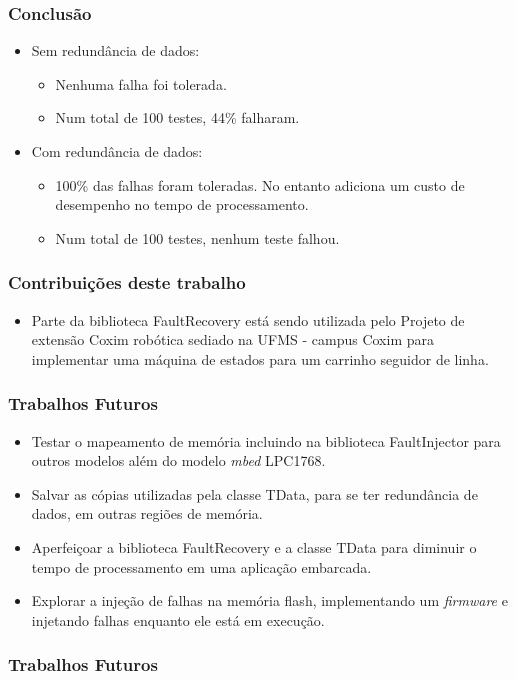 \begin{frame}
	\frametitle{Conclusão}
	\begin{itemize}
		\item Sem redundância de dados:
		\begin{itemize}			
			\item Nenhuma falha foi tolerada.
			\item Num total de 100 testes, 44\% falharam.
		\end{itemize}
		\item Com redundância de dados:
		\begin{itemize}
			\item 100\% das falhas foram toleradas. No entanto adiciona um custo de desempenho no tempo de processamento. 
			\item Num total de 100 testes, nenhum teste falhou.
		\end{itemize}
	\end{itemize}
\end{frame}

\begin{frame}
	\frametitle{Contribuições deste trabalho}
	\begin{itemize}
		\item Parte da biblioteca FaultRecovery está sendo utilizada pelo Projeto de extensão Coxim robótica sediado na UFMS - campus Coxim para implementar uma máquina de estados para um carrinho seguidor de linha.
	\end{itemize}
\end{frame}

\begin{frame}
	\frametitle{Trabalhos Futuros}
	\begin{itemize}
		\item Testar o mapeamento de memória incluindo na biblioteca FaultInjector para outros modelos além do modelo \textit{mbed} LPC1768.
		\item Salvar as cópias utilizadas pela classe TData, para se ter redundância de dados, em outras regiões de memória.
		\item Aperfeiçoar a biblioteca FaultRecovery e a classe TData para diminuir o tempo de processamento em uma aplicação embarcada.
		\item Explorar a injeção de falhas na memória flash, implementando um \textit{firmware} e injetando falhas enquanto ele está em execução.
	\end{itemize}
\end{frame}

\begin{frame}
	\frametitle{Trabalhos Futuros}
		\centering {}
\end{frame}

